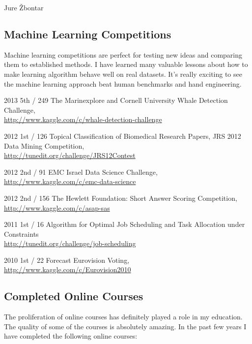 \documentclass[12pt,a4paper]{article}
\begin{document}
\begin{cv}{Jure \v{Z}bontar}
\subsection*{Machine Learning Competitions}
Machine learning competitions are perfect for testing new ideas and
comparing them to established methods. I have learned many valuable
lessons about how to make learning algorithm behave well on real
datasets. It's really exciting to see the machine learning approach beat
human benchmarks and hand engineering.

\begin{cvlist}{}
\item[2013 \quad 5th / 249] The Marinexplore and Cornell University Whale Detection
Challenge\footnotemark[1], \\
\url{http://www.kaggle.com/c/whale-detection-challenge}
\item[2012 \quad 1st / 126] Topical Classification of Biomedical Research Papers,
JRS 2012 Data Mining Competition\footnotemark[2], \\
\url{http://tunedit.org/challenge/JRS12Contest}
\item[2012 \quad 2nd / 91] EMC Israel Data Science Challenge\footnotemark[2], \\
\url{http://www.kaggle.com/c/emc-data-science}
\item[2012 \quad 2nd / 156] The Hewlett Foundation: Short Answer Scoring
Competition\footnotemark[1], \\
\url{http://www.kaggle.com/c/asap-sas}
\item[2011 \quad 1st / 16] Algorithm for Optimal Job Scheduling and Task
Allocation under Constraints\footnotemark[1] \\
\url{http://tunedit.org/challenge/job-scheduling}
\item[2010 \quad 1st / 22] Forecast Eurovision Voting\footnotemark[1], \\
\url{http://www.kaggle.com/c/Eurovision2010}
\end{cvlist}


\subsection*{Completed Online Courses}
The proliferation of online courses has definitely played a role in my
education.  The quality of some of the courses is absolutely amazing. In
the past few years I have completed the following online courses:


\end{cv}
\end{document}
